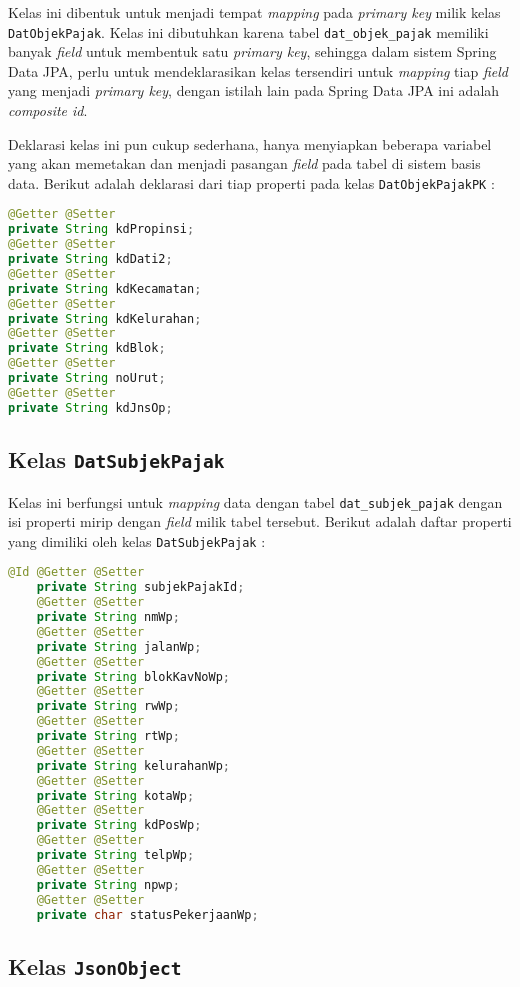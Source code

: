 \documentclass[pdftex,12pt, oneside]{article}
\begin{document}
Kelas ini dibentuk untuk menjadi tempat \textit{mapping} pada \textit{primary key} milik kelas \texttt{DatObjekPajak}. Kelas ini dibutuhkan karena tabel \texttt{dat\_objek\_pajak} memiliki banyak \textit{field} untuk membentuk satu \textit{primary key}, sehingga dalam sistem Spring Data JPA, perlu untuk mendeklarasikan kelas tersendiri untuk \textit{mapping} tiap \textit{field} yang menjadi \textit{primary key}, dengan istilah lain pada Spring Data JPA ini adalah \textit{composite id}.

Deklarasi kelas ini pun cukup sederhana, hanya menyiapkan beberapa variabel yang akan memetakan dan menjadi pasangan \textit{field} pada tabel di sistem basis data. Berikut adalah deklarasi dari tiap properti pada kelas \texttt{DatObjekPajakPK} :

\begin{lstlisting}[language=java]
@Getter @Setter
private String kdPropinsi;
@Getter @Setter
private String kdDati2;
@Getter @Setter
private String kdKecamatan;
@Getter @Setter
private String kdKelurahan;
@Getter @Setter
private String kdBlok;
@Getter @Setter
private String noUrut;
@Getter @Setter
private String kdJnsOp;
\end{lstlisting}													

\subsection{Kelas \texttt{DatSubjekPajak}}

Kelas ini berfungsi untuk \textit{mapping} data dengan tabel \texttt{dat\_subjek\_pajak} dengan isi properti mirip dengan \textit{field} milik tabel tersebut. Berikut adalah daftar properti yang dimiliki oleh kelas \texttt{DatSubjekPajak} :

\begin{lstlisting}[language=java]
    @Id @Getter @Setter
    private String subjekPajakId;
    @Getter @Setter
    private String nmWp;
    @Getter @Setter
    private String jalanWp;
    @Getter @Setter
    private String blokKavNoWp;
    @Getter @Setter
    private String rwWp;
    @Getter @Setter
    private String rtWp;
    @Getter @Setter
    private String kelurahanWp;
    @Getter @Setter
    private String kotaWp;
    @Getter @Setter
    private String kdPosWp;
    @Getter @Setter
    private String telpWp;
    @Getter @Setter
    private String npwp;
    @Getter @Setter
    private char statusPekerjaanWp;
\end{lstlisting}

\subsection{Kelas \texttt{JsonObject}}
\end{document}
